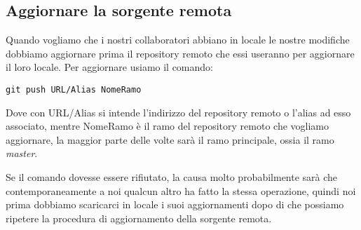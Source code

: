 \subsection{Aggiornare la sorgente remota}
Quando vogliamo che i nostri collaboratori abbiano in locale le nostre modifiche dobbiamo aggiornare prima il repository remoto che essi useranno per aggiornare il loro locale. Per aggiornare usiamo il comando:

\begin{center}
\texttt{git push URL/Alias NomeRamo}
\end{center}

Dove con URL/Alias si intende l'indirizzo del repository remoto o l'alias ad esso associato, mentre NomeRamo è il ramo del repository remoto che vogliamo aggiornare, la maggior parte delle volte sarà il ramo principale, ossia il ramo \textit{master}.

Se il comando dovesse essere rifiutato, la causa molto probabilmente sarà che contemporaneamente a noi qualcun altro ha fatto la stessa operazione, quindi noi prima dobbiamo scaricarci in locale i suoi aggiornamenti dopo di che possiamo ripetere la procedura di aggiornamento della sorgente remota.